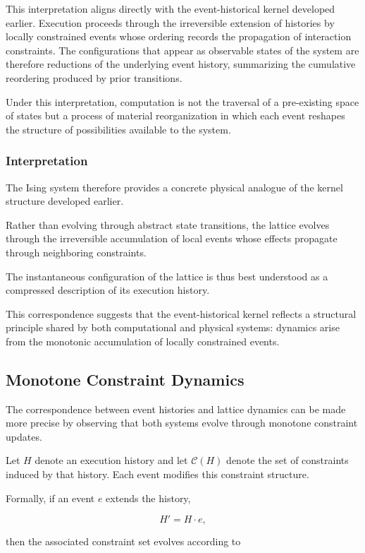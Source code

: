 \documentclass[12pt]{article}
\begin{document}
This interpretation aligns directly with the event-historical
kernel developed earlier. Execution proceeds through the
irreversible extension of histories by locally constrained
events whose ordering records the propagation of interaction
constraints. The configurations that appear as observable
states of the system are therefore reductions of the
underlying event history, summarizing the cumulative
reordering produced by prior transitions.

Under this interpretation, computation is not the traversal
of a pre-existing space of states but a process of
material reorganization in which each event reshapes the
structure of possibilities available to the system.

\subsubsection{Interpretation}

The Ising system therefore provides a concrete physical
analogue of the kernel structure developed earlier.

Rather than evolving through abstract state transitions,
the lattice evolves through the irreversible accumulation
of local events whose effects propagate through neighboring
constraints.

The instantaneous configuration of the lattice is thus
best understood as a compressed description of its
execution history.

This correspondence suggests that the event-historical
kernel reflects a structural principle shared by both
computational and physical systems: dynamics arise from
the monotonic accumulation of locally constrained events.

\subsection{Monotone Constraint Dynamics}

The correspondence between event histories and lattice dynamics
can be made more precise by observing that both systems evolve
through monotone constraint updates.

Let $H$ denote an execution history and let $\mathcal{C}(H)$
denote the set of constraints induced by that history.
Each event modifies this constraint structure.

Formally, if an event $e$ extends the history,

\[
H' = H \cdot e ,
\]

then the associated constraint set evolves according to
\end{document}

